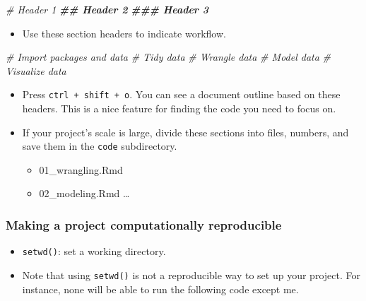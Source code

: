 \documentclass[
]{book}
\newenvironment{Shaded}{\begin{snugshade}}{\end{snugshade}}
\newcommand{\CommentTok}[1]{\textcolor[rgb]{0.56,0.35,0.01}{\textit{#1}}}
\newcommand{\DocumentationTok}[1]{\textcolor[rgb]{0.56,0.35,0.01}{\textbf{\textit{#1}}}}
\providecommand{\tightlist}{%
  \setlength{\itemsep}{0pt}\setlength{\parskip}{0pt}}
\begin{document}
\begin{Shaded}
\begin{Highlighting}[]
\CommentTok{\# Header 1}
\DocumentationTok{\#\# Header 2}
\DocumentationTok{\#\#\# Header 3}
\end{Highlighting}
\end{Shaded}

\begin{itemize}
\tightlist
\item
  Use these section headers to indicate workflow.
\end{itemize}

\begin{Shaded}
\begin{Highlighting}[]
\CommentTok{\# Import packages and data}
\CommentTok{\# Tidy data}
\CommentTok{\# Wrangle data}
\CommentTok{\# Model data}
\CommentTok{\# Visualize data}
\end{Highlighting}
\end{Shaded}

\begin{itemize}
\item
  Press \texttt{ctrl\ +\ shift\ +\ o}. You can see a document outline based on these headers. This is a nice feature for finding the code you need to focus on.
\item
  If your project's scale is large, divide these sections into files, numbers, and save them in the \texttt{code} subdirectory.

  \begin{itemize}
  \tightlist
  \item
    01\_wrangling.Rmd
  \item
    02\_modeling.Rmd
    \ldots{}
  \end{itemize}
\end{itemize}

\hypertarget{making-a-project-computationally-reproducible}{%
\subsubsection{Making a project computationally reproducible}\label{making-a-project-computationally-reproducible}}

\begin{itemize}
\item
  \texttt{setwd()}: set a working directory.
\item
  Note that using \texttt{setwd()} is not a reproducible way to set up your project. For instance, none will be able to run the following code except me.
\end{itemize}
\end{document}
